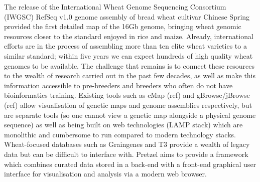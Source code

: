 \documentclass{bioinfo}
\begin{document}
The release of the International Wheat Genome Sequencing Consortium (IWGSC) RefSeq v1.0 genome assembly of bread wheat cultivar Chinese Spring provided the first detailed map of the 16Gb genome, bringing wheat genomic resources closer to the standard enjoyed in rice and maize. 
Already, international efforts are in the process of assembling more than ten elite wheat varieties to a similar standard; within five years we can expect hundreds of high quality wheat genomes to be available. 
The challenge that remains is to connect these resources to the wealth of research carried out in the past few decades, as well as make this information accessible to pre-breeders and breeders who often do not have bioinformatics training. 
Existing tools such as cMap (ref) and gBrowse/jBrowse (ref) allow visualisation of genetic maps and genome assemblies respectively, but are separate tools (so one cannot view a genetic map alongside a physical genome sequence) as well as being built on web technologies (LAMP stack) which are monolithic and cumbersome to run compared to modern technology stacks. 
Wheat-focused databases such as Graingenes and T3 provide a wealth of legacy data but can be difficult to interface with. 
Pretzel aims to provide a framework which combines curated data stored in a back-end with a front-end graphical user interface for visualisation and analysis via a modern web browser.
\end{document}
